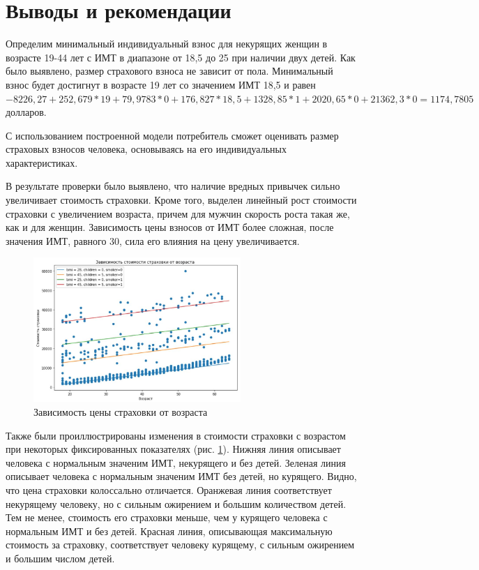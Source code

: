 \documentclass[a4paper,12pt]{article}
\begin{document}
\section{Выводы и рекомендации}
Определим минимальный индивидуальный взнос для некурящих женщин в возрасте 19-44 лет с ИМТ в диапазоне от 18,5 до 25 при наличии двух детей. Как было выявлено, размер страхового взноса не зависит от пола. Минимальный взнос будет достигнут в возрасте 19 лет со значением ИМТ 18,5 и равен $-8226,27 + 252,679 * 19 + 79,9783 * 0 + 176,827 * 18,5 + 1328,85 * 1  + 2020,65 * 0 + 21362,3 * 0 = 1174,7805$ долларов.

С использованием построенной модели потребитель сможет оценивать размер страховых взносов человека, основываясь на его индивидуальных характеристиках. 

В результате проверки было выявлено, что наличие вредных привычек сильно увеличивает стоимость страховки. Кроме того, выделен линейный рост стоимости страховки с увеличением возраста, причем для мужчин скорость роста такая же, как и для женщин. Зависимость цены взносов от ИМТ более сложная, после значения ИМТ, равного 30, сила его влияния на цену увеличивается.

\begin{figure}[H]
	\includegraphics[width=0.7\textwidth]{../[graphics]/example.jpg}
	\centering
	\caption{Зависимость цены страховки от возраста}
	\label{fig:example}
\end{figure}

Также были проиллюстрированы изменения в стоимости страховки с возрастом при некоторых фиксированных показателях (рис. \ref{fig:example}). Нижняя линия описывает человека с нормальным значеним ИМТ, некурящего и без детей. Зеленая линия описывает человека с нормальным значеним ИМТ без детей, но курящего. Видно, что цена страховки колоссально отличается. Оранжевая линия соответствует некурящему человеку, но с сильным ожирением и большим количеством детей. Тем не менее, стоимость его страховки меньше, чем у курящего человека с нормальным ИМТ и без детей. Красная линия, описывающая максимальную стоимость за страховку, соответствует человеку курящему, с сильным ожирением и большим числом детей.
\end{document}
